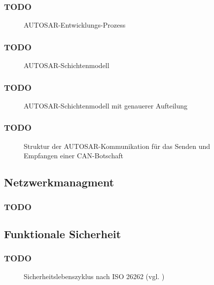 \documentclass[draft]{beamer}
\newcommand{\inputImage}[1]{}
\begin{document}
\begin{frame}
\frametitle{TODO}
    \begin{figure}[ht]
        \centering
        \resizebox{\linewidth}{!}{\inputImage{Autosar_Prozess.dia}}
        \caption{AUTOSAR-Entwicklungs-Prozess}
        \label{fig:autosar_prozess}
    \end{figure}
\end{frame}

\begin{frame}
\frametitle{TODO}
    \begin{figure}[ht]
        \centering
        \resizebox{\linewidth}{!}{\inputImage{autosar_layer.dia}}
        \caption{AUTOSAR-Schichtenmodell}
        \label{fig:autosar_layer}
    \end{figure}
\end{frame}

\begin{frame}
\frametitle{TODO}
    \begin{figure}[ht]
        \centering
        \resizebox{\linewidth}{!}{\inputImage{autosar_refined_layer.dia}}
        \caption{AUTOSAR-Schichtenmodell mit genauerer Aufteilung}
        \label{fig:autosar_refined_layer}
    \end{figure}
\end{frame}

\begin{frame}
\frametitle{TODO}
    \begin{figure}[ht]
        \centering
        \inputImage{komm_beispiel.dia}
        \caption[Struktur der AUTOSAR-Kommunikation]{Struktur der AUTOSAR-Kommunikation für das Senden und Empfangen einer CAN-Botschaft}
        \label{fig:komm_beispiel}
    \end{figure}
\end{frame}




\subsection{Netzwerkmanagment}
\begin{frame}
\frametitle{TODO}

\end{frame}

\subsection{Funktionale Sicherheit}
\begin{frame}
\frametitle{TODO}
    \begin{figure}[!htbp]
        \center
        \inputImage{ISO_26262_Lifecycle.dia}
        \caption[Sicherheitslebenszyklus nach ISO 26262]{Sicherheitslebenszyklus nach ISO 26262 (vgl. \cite{iso26262})}
        \label{fig:lifecycle}
    \end{figure}
\end{frame}
\end{document}
